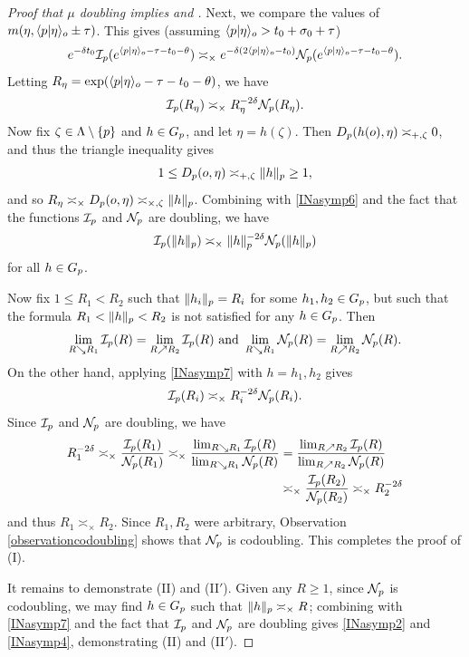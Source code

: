 \begin{proof}[Proof that $\mu$ doubling implies  and ]
Next, we compare the values of $m(\eta,\langle p|\eta\rangle_o \pm\tau)$. This gives (assuming $\langle p|\eta\rangle_o > t_0 + \sigma_0 + \tau$)
\[
e^{-\delta t_0} \mathcal I_p(e^{\langle p|\eta\rangle_o - \tau - t_0 - \theta}) \asymp_\times e^{-\delta (2\langle p|\eta\rangle_o - t_0)} \mathcal N_p(e^{\langle p|\eta\rangle_o - \tau - t_0 - \theta}).
\]
Letting $R_\eta = \exp(\langle p|\eta\rangle_o - \tau - t_0 - \theta)$, we have
\begin{equation}
\label{INasymp6}
\mathcal I_p(R_\eta) \asymp_\times R_\eta^{-2\delta} \mathcal N_p(R_\eta).
\end{equation}
Now fix $\zeta\in\Lambda\setminus\{p\}$ and $h\in G_p$, and let $\eta = h(\zeta)$. Then $D_p(h(o),\eta) \asymp_{+,\zeta} 0$, and thus the triangle inequality gives
\[
1 \leq D_p(o,\eta) \asymp_{+,\zeta} \|h\|_p \geq 1,
\]
and so $R_\eta \asymp_\times D_p(o,\eta) \asymp_{\times,\zeta} \|h\|_p$. Combining with \eqref{INasymp6} and the fact that the functions $\mathcal I_p$ and $\mathcal N_p$ are doubling, we have
\begin{equation}
\label{INasymp7}
\mathcal I_p(\|h\|_p) \asymp_\times \|h\|_p^{-2\delta} \mathcal N_p(\|h\|_p)
\end{equation}
for all $h\in G_p$.

Now fix $1\leq R_1 < R_2$ such that $\|h_i\|_p = R_i$ for some $h_1,h_2\in G_p$, but such that the formula $R_1 < \|h\|_p < R_2$ is not satisfied for any $h\in G_p$. Then
\[
\lim_{R\searrow R_1} \mathcal I_p(R) = \lim_{R\nearrow R_2} \mathcal I_p(R) \textup{ and } \lim_{R\searrow R_1} \mathcal N_p(R) = \lim_{R\nearrow R_2} \mathcal N_p(R).
\]
On the other hand, applying \eqref{INasymp7} with $h = h_1,h_2$ gives
\[
\mathcal I_p(R_i) \asymp_\times R_i^{-2\delta} \mathcal N_p(R_i).
\]
Since $\mathcal I_p$ and $\mathcal N_p$ are doubling, we have
\begin{align*}
R_1^{-2\delta}
\asymp_\times \frac{\mathcal I_p(R_1)}{\mathcal N_p(R_1)}
\asymp_\times \frac{\lim_{R\searrow R_1} \mathcal I_p(R)}{\lim_{R\searrow R_1} \mathcal N_p(R)}
&= \frac{\lim_{R\nearrow R_2} \mathcal I_p(R)}{\lim_{R\nearrow R_2} \mathcal N_p(R)}\\
&\asymp_\times \frac{\mathcal I_p(R_2)}{\mathcal N_p(R_2)}
\asymp_\times R_2^{-2\delta}
\end{align*}
and thus $R_1 \asymp_\times R_2$. Since $R_1,R_2$ were arbitrary, Observation \ref{observationcodoubling} shows that $\mathcal N_p$ is codoubling. This completes the proof of (I).

It remains to demonstrate (II) and (II$'$). Given any $R\geq 1$, since $\mathcal N_p$ is codoubling, we may find $h\in G_p$ such that $\|h\|_p \asymp_\times R$; combining with \eqref{INasymp7} and the fact that $\mathcal I_p$ and $\mathcal N_p$ are doubling gives \eqref{INasymp2} and \eqref{INasymp4}, demonstrating (II) and (II$'$).
\end{proof}

